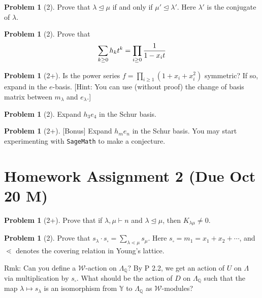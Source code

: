 \documentclass{amsart}
\theoremstyle{plain}
\theoremstyle{definition}
\newtheorem{problem}[theorem]{Problem}
\begin{document}
	\begin{problem}[2]
		Prove that $\lambda\trianglelefteq \mu$ if and only if $\mu'\trianglelefteq \lambda'$. Here $\lambda'$ is the conjugate of $\lambda$.
	\end{problem}
	
	\begin{problem}[2]
		Prove that
		\[\sum_{k\geq 0} h_k t^k = \prod_{i\geq0}{1\over 1-x_it}\]
	\end{problem}
	
	\begin{problem}[2+]
		Is the power series $f=\prod_{i\geq 1}(1+x_i+x_i^2)$ symmetric? If so, expand in the $e$-basis. [Hint: You can use (without proof) the change of basis matrix between $m_\lambda$ and $e_\lambda$.]
	\end{problem}
		\begin{problem}[2]
		Expand $h_3e_4$ in the Schur basis. 	
	\end{problem}
	\begin{problem}[2+]
		[Bonus] Expand $h_me_n$ in the Schur basis. You may start experimenting with {\tt{SageMath}} to make a conjecture.
	\end{problem}
	
	
	\section{Homework Assignment 2 (Due Oct 20 M)}
	\begin{problem}[2+] 		Prove that if $\lambda,\mu\vdash n$ and $\lambda\trianglelefteq \mu$, then $K_{\lambda\mu}\neq 0$.
	\end{problem}
\begin{problem}[2]
	Prove that $s_\lambda\cdot s_{\square}=\sum_{\lambda \lessdot \mu}{s_\mu}$. Here $s_{\square}=m_1=x_1+x_2+\cdots$, and $\lessdot$ denotes the covering relation in Young's lattice.
\end{problem}

{\color{blue}Rmk: Can you define a $\mathcal{W}$-action on $\Lambda_{\mathbb{Q}}$? By P 2.2, we get an action of $U$ on $\Lambda$ via multiplication by $s_{\square}$. What should be the action of $D$ on $\Lambda_{\mathbb{Q}}$ such that the map $ \lambda \mapsto s_\lambda$ is an isomorphism from $\mathbb{Y}$ to $\Lambda_{\mathbb{Q}}$ as $\mathcal{W}$-modules?}
\end{document}
